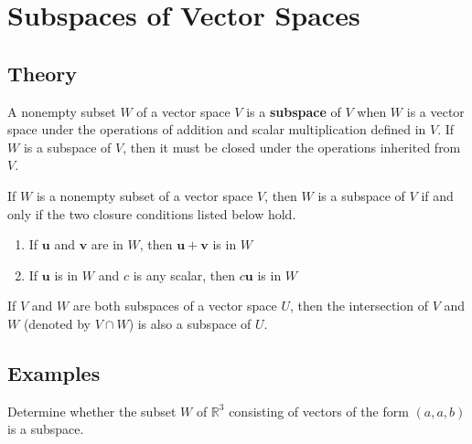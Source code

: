 \documentclass{report}
\begin{document}
\section{Subspaces of Vector Spaces}

\subsection{Theory}

\begin{tcolorbox}[title = Definition of a Subspace of a Vector Space]
	
 A nonempty subset $W$ of a vector space $V$ is a \textbf{subspace} of $V$ when $W$ is a vector space under the operations of addition and scalar multiplication defined in $V$. If $W$ is a subspace of $V$, then it must be closed under the operations inherited from $V$.

\end{tcolorbox}

\begin{tcolorbox}[title = Test for a Subspace]

If $W$ is a nonempty subset of a vector space $V$, then $W$ is a subspace of $V$ if and only if the two closure conditions listed below hold.
\begin{enumerate}
    \item If $\bm{u}$ and $\bm{v}$ are in $W$, then $\bm{u} + \bm{v}$ is in $W$
    \item If $\bm{u}$ is in $W$ and $c$ is any scalar, then $c\bm{u}$ is in $W$
\end{enumerate}

\end{tcolorbox}

\begin{tcolorbox}[title = The Intersection of Two Subspaces Is A Subspace]
	If $V$ and $W$ are both subspaces of a vector space $U$, then the intersection of $V$ and $W$ (denoted by $V \cap W$) is also a subspace of $U$.

\end{tcolorbox}

\subsection{Examples}

\begin{tcolorbox}[colframe = lightred]

 
 Determine whether the subset $W$ of $\mathbb{R}^3$ consisting of vectors of the form $(a,a,b)$ is a subspace.

\end{tcolorbox}
\end{document}
